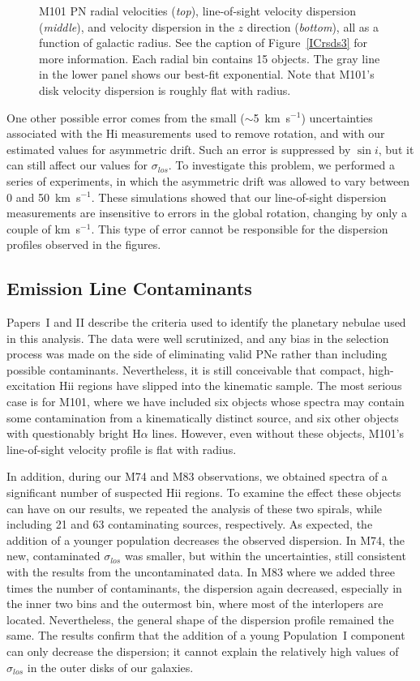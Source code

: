 \documentclass[12pt,preprint]{emulateapj}
\newcommand{\kms}{km~s$^{-1}$}
\begin{document}
\begin{figure}[t]
\caption{\scriptsize M101 PN radial velocities ({\it top}), line-of-sight velocity dispersion ({\it middle}), and velocity dispersion in the $z$ direction ({\it bottom}), all as a function of galactic radius.  See the caption of Figure~\ref{ICrsds3} for more information.  Each radial bin contains 15 objects.   The gray line in the lower panel shows our best-fit exponential. Note that M101's disk velocity dispersion is roughly flat with radius. \label{M101rsds3}}
\end{figure}

One other possible error comes from the small ($\sim$5~\kms) uncertainties associated with the H{\sc i} measurements used to remove rotation, and with our estimated values for asymmetric drift.  Such an error is suppressed by $\sin i$, but it can still affect our values for $\sigma_{los}$.  To investigate this problem, we performed a series of experiments, in which the asymmetric drift was allowed to vary between 0 and 50~\kms.  These simulations showed that our line-of-sight dispersion measurements are insensitive to errors in the global rotation, changing by only a couple of \kms.  This type of error cannot be responsible for the dispersion profiles observed in the figures.

\subsection{Emission Line Contaminants}
Papers~I and II describe the criteria used to identify the planetary nebulae used in this analysis.  The data were well scrutinized, and any bias in the selection process was made on the side of eliminating valid PNe rather than including possible contaminants.  Nevertheless, it is still conceivable that compact, high-excitation H{\sc ii} regions have slipped into the kinematic sample.  The most serious case is for M101, where we have included six objects whose spectra may contain some contamination from a kinematically distinct source, and six other objects with questionably bright H$\alpha$ lines.  However, even without these objects, M101's line-of-sight velocity profile is flat with radius.

In addition, during our M74 and M83 observations, we obtained spectra of a significant number of suspected H{\sc ii} regions.  To examine the effect these objects can have on our results, we repeated the analysis of these two spirals, while including 21 and 63 contaminating sources, respectively.  As expected, the addition of a younger population decreases the observed dispersion.  In M74, the new, contaminated $\sigma_{los}$ was smaller, but within the uncertainties, still consistent with the results from the uncontaminated data.  In M83 where we added three times the number of contaminants, the dispersion again decreased, especially in the inner two bins and the outermost bin, where most of the interlopers are located.  Nevertheless, the general shape of the dispersion profile remained the same.  The results confirm that the addition of a young Population~I component can only decrease the dispersion; it cannot explain the relatively high values of $\sigma_{los}$ in the outer disks of our galaxies.
\end{document}
